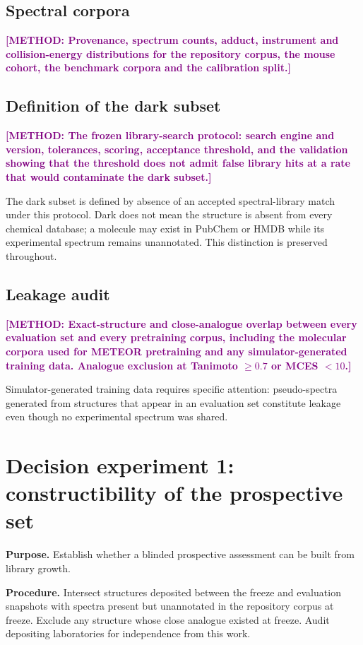 \documentclass[12pt]{article}
\newcommand{\methodtodo}[1]{\textbf{\textcolor{purple}{[METHOD: #1]}}}
\begin{document}
\subsection{Spectral corpora}
\methodtodo{Provenance, spectrum counts, adduct, instrument and collision-energy distributions for the repository corpus, the mouse cohort, the benchmark corpora and the calibration split.}

\subsection{Definition of the dark subset}
\methodtodo{The frozen library-search protocol: search engine and version, tolerances, scoring, acceptance threshold, and the validation showing that the threshold does not admit false library hits at a rate that would contaminate the dark subset.}

The dark subset is defined by absence of an accepted spectral-library match under this protocol. Dark does not mean the structure is absent from every chemical database; a molecule may exist in PubChem or HMDB while its experimental spectrum remains unannotated. This distinction is preserved throughout.

\subsection{Leakage audit}
\methodtodo{Exact-structure and close-analogue overlap between every evaluation set and every pretraining corpus, including the molecular corpora used for METEOR pretraining and any simulator-generated training data. Analogue exclusion at Tanimoto $\geq 0.7$ or MCES $< 10$.}

Simulator-generated training data requires specific attention: pseudo-spectra generated from structures that appear in an evaluation set constitute leakage even though no experimental spectrum was shared.

\section{Decision experiment 1: constructibility of the prospective set}

\textbf{Purpose.} Establish whether a blinded prospective assessment can be built from library growth.

\textbf{Procedure.} Intersect structures deposited between the freeze and evaluation snapshots with spectra present but unannotated in the repository corpus at freeze. Exclude any structure whose close analogue existed at freeze. Audit depositing laboratories for independence from this work.
\end{document}
